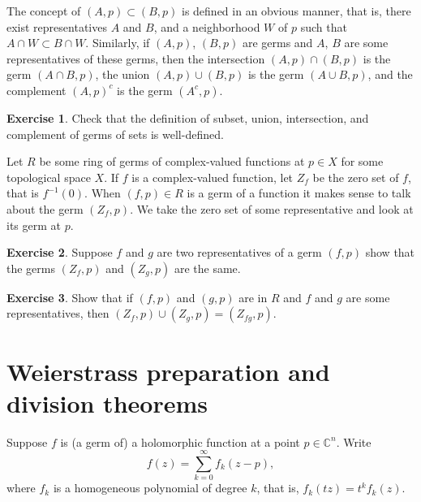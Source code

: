 \documentclass[12pt,openany]{book}
\newcommand{\C}{{\mathbb{C}}}
\theoremstyle{plain}
\theoremstyle{remark}
\theoremstyle{definition}
\newenvironment{exbox}{%
    \def\FrameCommand{\vrule width 1pt \relax\hspace{10pt}}%
    \MakeFramed{\advance\hsize-\width\FrameRestore}%
}{%
    \endMakeFramed
}
\theoremstyle{exercise}
\newtheorem{exercise}{Exercise}[section]
\theoremstyle{example}
\begin{document}
The concept of $(A,p) \subset (B,p)$ is defined in an obvious manner,
that is, there exist representatives $A$ and $B$, and a neighborhood $W$
of $p$ such that $A \cap W \subset B \cap W$.
Similarly,
if $(A,p)$, $(B,p)$ are germs and $A$, $B$
are some representatives of these germs, then
the intersection $(A,p) \cap (B,p)$
is the germ $(A \cap B,p)$, the union
$(A,p) \cup (B,p)$ is the germ $(A \cup B,p)$,
and the complement $(A,p)^c$ is the germ $(A^c,p)$.

\begin{exbox}
\begin{exercise}
Check that the definition of
subset, union, intersection, and complement of germs
of sets
is well-defined.
\end{exercise}
\end{exbox}


Let $R$ be some ring of germs of complex-valued
functions at $p \in X$ for some topological space $X$.
%
If $f$ is a complex-valued function,
let $Z_f$ be the zero set of $f$, that is $f^{-1}(0)$.
When $(f,p) \in R$ is a germ of a function
it makes sense to talk about the germ $(Z_f,p)$.  We take the zero
set of some representative and look at its germ at $p$.

\begin{exbox}
\begin{exercise}
Suppose $f$ and $g$ are two representatives of a germ $(f,p)$
show that the germs $(Z_f,p)$ and $(Z_g,p)$ are the same.
\end{exercise}

\begin{exercise}
Show that if $(f,p)$ and $(g,p)$ are in $R$
and $f$ and $g$ are some representatives, then
$(Z_f,p) \cup (Z_g,p) = (Z_{fg},p)$.
\end{exercise}
\end{exbox}


\section{Weierstrass preparation and division theorems} \label{sec:wpt}

Suppose
$f$ is (a germ of) a holomorphic function at a point $p \in \C^n$.
Write
\begin{equation*}
f(z) = \sum_{k=0}^\infty f_k(z-p),
\end{equation*}
where $f_k$ is a homogeneous polynomial of degree $k$,
that is, $f_k(tz) = t^k f_k(z)$.
\end{document}
